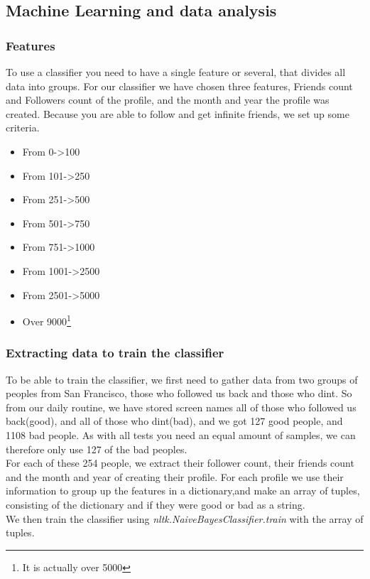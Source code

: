 \subsection{Machine Learning and data analysis}
\subsubsection{Features}
To use a classifier you need to have a single feature or several, that divides all data into groups. For our classifier we have chosen three features, Friends count and Followers count of the profile, and the month and year the profile was created. Because you are able to follow and get infinite friends, we set up some criteria.\\
\begin{itemize}
	\item{From 0->100}
	\item{From 101->250}
	\item{From 251->500}
	\item{From 501->750}
	\item{From 751->1000}
	\item{From 1001->2500}
	\item{From 2501->5000}
	\item{Over 9000\footnote{It is actually over 5000}}
\end{itemize}
\subsubsection{Extracting data to train the classifier}
To be able to train the classifier, we first need to gather data from two groups of peoples from San Francisco, those who followed us back and those who dint. So from our daily routine, we have stored screen names all of those who followed us back(good), and all of those who dint(bad), and we got 127 good people, and 1108 bad people. As with all tests you need an equal amount of samples, we can therefore only use 127 of the bad peoples.\\
For each of these 254 people, we extract their follower count, their friends count and the month and year of creating their profile. For each profile we use their information to group up the features in a dictionary,and make an array of tuples, consisting of the dictionary and if they were good or bad as a string.\\
We then train the classifier using \textit{nltk.NaiveBayesClassifier.train} with the array of tuples.

